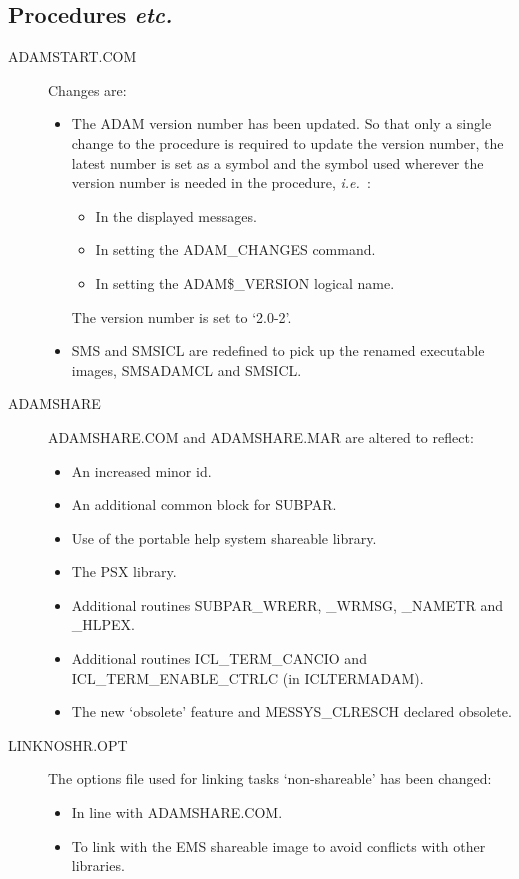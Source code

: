 \subsection{Procedures {\em etc.}}
\begin{description}

\item[ADAMSTART.COM] Changes are:
\begin{itemize}
\item The ADAM version number has been updated. So that
only a single change to the procedure is required to update the version
number, the latest number is set as a symbol and the symbol used wherever the
version number is needed in the procedure,
{\em i.e.\ }:
\begin{itemize}
\item In the displayed messages.
\item In setting the ADAM\_CHANGES command.
\item In setting the ADAM\$\_VERSION logical name.
\end{itemize}

The version number is set to `2.0-2'.

\item SMS and SMSICL are redefined to pick up the renamed executable images,
SMS\-ADAMCL and SMSICL.
\end{itemize}

\item[ADAMSHARE]
ADAMSHARE.COM and ADAMSHARE.MAR are altered to reflect:
\begin{itemize}
\item An increased minor id.
\item An additional common block for SUBPAR.
\item Use of the portable help system shareable library.
\item The PSX library.
\item Additional routines SUBPAR\_WRERR, \_WRMSG, \_NAMETR and \_HLPEX.
\item Additional routines ICL\_TERM\_CANCIO and ICL\_TERM\_ENABLE\_CTRLC
(in ICLTERMADAM).
\item The new `obsolete' feature and MESSYS\_CLRESCH declared obsolete.
\end{itemize}

\item[LINKNOSHR.OPT]
The options file used for linking tasks `non-shareable' has been changed:
\begin{itemize}
\item In line with ADAMSHARE.COM.
\item To link with the EMS shareable image to avoid conflicts with other
libraries.
\end{itemize}


\end{description}
